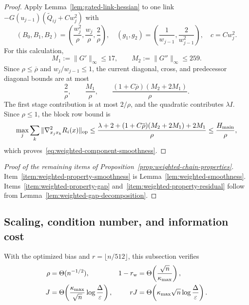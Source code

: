\documentclass{article}
\theoremstyle{definition}
\newcommand{\op}{\mathrm{op}}
\begin{document}
\begin{proof}
Apply Lemma~\ref{lem:gated-link-hessian} to one link
$-G(u_{j-1})(\widetilde Q_{ij}+Cw_j^2)$ with
\begin{equation}
 (B_0,B_1,B_2)
 =\left(\frac{w_j^2}{\rho},\frac{w_j}{\rho},\frac2\rho\right),
 \quad
 (g_1,g_2)=\left(\frac1{w_{j-1}},\frac2{w_{j-1}^2}\right),
 \quad c=Cw_j^2.
\end{equation}
For this calculation,
\begin{equation}
 M_1:=\|G'\|_\infty\le17,
 \qquad
 M_2:=\|G''\|_\infty\le259.
 \label{eq:pl-local-gate-derivatives}
\end{equation}
Since $\rho\le\overline\rho$ and $w_j/w_{j-1}\le1$, the current diagonal,
cross, and predecessor diagonal bounds are at most
\begin{equation}
 \frac2\rho,\qquad
 \frac{M_1}\rho,\qquad
 \frac{(1+C\overline\rho)(M_2+2M_1)}\rho.
\end{equation}
The first stage contribution is at most $2/\rho$, and the quadratic contributes
$\lambda I$.  Since $\rho\le1$, the block row bound is
\begin{equation}
 \max_j\sum_k\|\nabla^2_{x_jx_k}R_i(x)\|_{\op}
 \le\frac{\lambda+2+(1+C\overline\rho)(M_2+2M_1)+2M_1}{\rho}
 \le\frac{H_{\rm main}}{\rho},
\end{equation}
which proves~\eqref{eq:weighted-component-smoothness}.
\end{proof}

\begin{proof}[Proof of the remaining items of
Proposition~\ref{prop:weighted-chain-properties}]
Item~\ref{item:weighted-property-smoothness} is
Lemma~\ref{lem:weighted-smoothness}.  Items~\ref{item:weighted-property-gap}
and~\ref{item:weighted-property-residual} follow from
Lemma~\ref{lem:weighted-gap-decomposition}.
\end{proof}

\subsection{Scaling, condition number, and information cost}

With the optimized bias and $r=\lfloor n/512\rfloor$, this subsection
verifies
\begin{equation*}
\begin{aligned}
 \rho&=\Theta(n^{-1/2}),
 &1-r_{\rm w}&=\Theta\!\left(\frac{\sqrt n}{\kappa_{\max}}\right),\\
 J&=\Theta\!\left(\frac{\kappa_{\max}}{\sqrt n}
     \log\frac{\Delta}{\varepsilon}\right),
 &rJ&=\Theta\!\left(\kappa_{\max}\sqrt n
     \log\frac{\Delta}{\varepsilon}\right).
\end{aligned}
\end{equation*}
\end{document}
